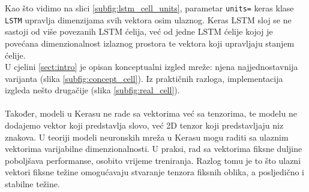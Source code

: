 \documentclass[conference]{IEEEtran}
\begin{document}
\begin{figure}[H]
{
}
\caption{ }
\end{figure}

Kao što vidimo na slici \ref{subfig:lstm_cell_units}, parametar \texttt{units=} keras klase \texttt{LSTM} upravlja dimenzijama svih vektora osim ulaznog. Keras LSTM sloj se ne sastoji od više povezanih LSTM ćelija, već od jedne LSTM ćelije kojoj je povećana dimenzionalnost izlaznog prostora te vektora koji upravljaju stanjem ćelije.
\ \\
U cjelini \ref{sect:intro} je opisan konceptualni izgled mreže: njena najjednostavnija varijanta (slika \ref{subfig:concept_cell}). Iz praktičnih razloga, implementacija izgleda nešto drugačije (slika \ref{subfig:real_cell}).\\
\\
Također, modeli u Kerasu ne rade sa vektorima već sa tenzorima, te modelu ne dodajemo vektor koji predstavlja slovo, već 2D tenzor koji predstavljaju niz znakova.
U teoriji modeli neuronskih mreža u Kerasu mogu raditi sa ulaznim vektorima varijabilne dimenzionalnosti. U praksi, rad sa vektorima fiksne duljine poboljšava performanse, osobito vrijeme treniranja. Razlog tomu je to što ulazni vektori fiksne težine omogućavaju stvaranje tenzora fiksnih oblika, a posljedično i stabilne težine.\\
\end{document}
